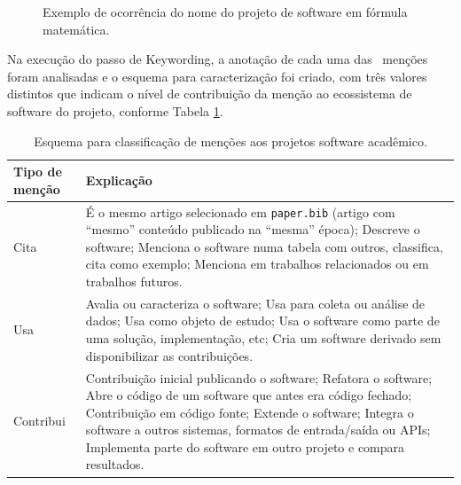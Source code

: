 \begin{figure}[h]
  \center
  \caption{Exemplo de ocorrência do nome do projeto de software em fórmula matemática.}
  \label{screenshot-paper-p148-2ls}
\end{figure}

Na execução do passo de Keywording, 
a anotação de cada uma das \ScreeningCount \ menções foram analisadas e o
esquema para caracterização foi criado, com três valores distintos que
indicam o nível de contribuição da menção ao ecossistema de software do projeto,
conforme Tabela \ref{esquema-de-mencao}.

\begin{table}[h]
\caption{Esquema para classificação de menções aos projetos software acadêmico.}
\centering
\begin{tabular}{ l p{10cm} }
  \hline
  Tipo de menção           & Explicação \\
  \hline
  Cita      & É o mesmo artigo selecionado em \texttt{paper.bib} (artigo com ``mesmo'' conteúdo publicado na ``mesma'' época); Descreve o software; Menciona o software numa tabela com outros, classifica, cita como exemplo; Menciona em trabalhos relacionados ou em trabalhos futuros. \\
  Usa       & Avalia ou caracteriza o software; Usa para coleta ou análise de dados; Usa como objeto de estudo; Usa o software como parte de uma solução, implementação, etc; Cria um software derivado sem disponibilizar as contribuições. \\
  Contribui & Contribuição inicial publicando o software; Refatora o software; Abre o código de um software que antes era código fechado; Contribuição em código fonte; Extende o software; Integra o software a outros sistemas, formatos de entrada/saída ou APIs; Implementa parte do software em outro projeto e compara resultados. \\
  \hline
\end{tabular}
\label{esquema-de-mencao}
\end{table}

